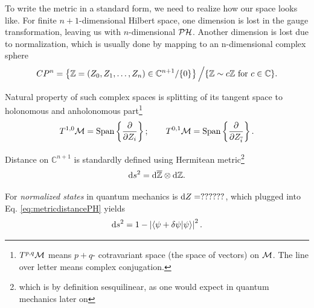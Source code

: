 To write the metric in a standard form, we need to realize how our space looks like. For finite $n+1$-dimensional Hilbert space, one dimension is lost in the gauge transformation, leaving us with $n$-dimensional $\mathcal{PH}$. Another dimension is lost due to normalization, which is usually done by mapping to an n-dimensional complex sphere
$$CP^n= \left\{ \mathbb{Z}=(Z_0,Z_1,\dots,Z_n)\in \mathbb{C}^{n+1}/\{0\} \right\}\Big/ \{\mathbb{Z}\sim c\mathbb{Z} \text{ for } c\in \mathbb{C}\}.$$

Natural property of such complex spaces is splitting of its tangent space to holonomous and anholonomous part\footnote{$T^{p,q}\mathcal{M}$ means $p+q$- cotravariant space (the space of vectors) on $\mathcal{M}$. The line over letter means complex conjugation.}
$$T^{1,0}\mathcal{M}=\text{Span}\left\{\frac{\partial}{\partial Z_i}\right\}; \qquad T^{0,1}\mathcal{M}=\text{Span}\left\{\frac{\partial}{\partial Z_{\overline{i}}}\right\}.$$


Distance on $\mathbb{C}^{n+1}$ is standardly defined using Hermitean metric\footnote{which is by definition sesquilinear, as one would expect in quantum mechanics later on} 
\begin{equation}
    \mathrm{d} s^2 = \mathrm{d} \overline{\mathbb{Z}} \otimes \mathrm{d} \mathbb{Z}.
\label{eq:metricdistancePH}
\end{equation}


For \emph{normalized states} in quantum mechanics is $\mathrm{d} Z=??????$, which plugged into Eq. \ref{eq:metricdistancePH} yields
\begin{equation}
    \mathrm{d} s^2 = 1-\left|\braket{\psi+\delta \psi|\psi}\right|^2.
    \label{eq:distanceInPH}
\end{equation}


